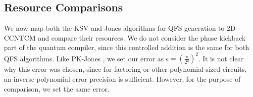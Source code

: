 \subsection{Resource Comparisons}
\label{subsec:ksv-compare}

We now map both the KSV and Jones algorithms for QFS generation
to \textsf{2D CCNTCM} and compare their resources. We do not consider
the phase kickback part of the quantum compiler, since this controlled addition
is the same for both QFS algorithms. Like PK-Jones \cite{Jones2012}, we
set our error as $\epsilon = \left(\frac{\pi}{2^{\eta}}\right)^2$. It is not clear why
this error was chosen, since for factoring or other polynomial-sized circuits,
an inverse-polynomial error precision is sufficient. However, for the
purpose of comparison, we set the same error.

